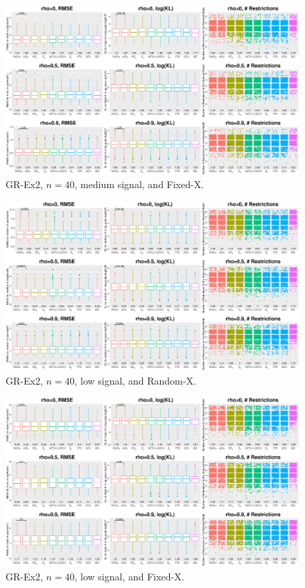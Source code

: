 \begin{figure}[!ht]
\centering
\includegraphics[width=\textwidth]{figures/supplement/fixedx_GR-Ex2_n40_msnr.eps}
\caption{GR-Ex2, $n=40$, medium signal, and Fixed-X.}
\end{figure}
\clearpage
\begin{figure}[!ht]
\centering
\includegraphics[width=\textwidth]{figures/supplement/randomx_GR-Ex2_n40_lsnr.eps}
\caption{GR-Ex2, $n=40$, low signal, and Random-X.}
\end{figure}
\begin{figure}[!ht]
\centering
\includegraphics[width=\textwidth]{figures/supplement/fixedx_GR-Ex2_n40_lsnr.eps}
\caption{GR-Ex2, $n=40$, low signal, and Fixed-X.}
\end{figure}
